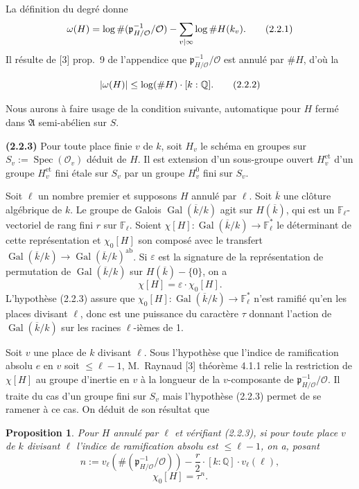 \documentclass[12pt,a4paper]{article}
\theoremstyle{plain}
\newtheorem{proposition}[theorem]{Proposition}
\theoremstyle{definition}
\theoremstyle{remark}
\DeclareMathOperator{\Spec}{Spec}
\DeclareMathOperator{\Gal}{Gal}
\newcommand{\QQ}{\mathbb{Q}}
\newcommand{\FF}{\mathbb{F}}
\newcommand{\cO}{\mathcal{O}}
\newcommand{\fA}{\mathfrak{A}}
\let\deg\relax
\providecommand{\FF}{\mathbb{F}}
\providecommand{\QQ}{\mathbb{Q}}
\providecommand{\cO}{\mathcal{O}}
\providecommand{\fA}{\mathfrak{A}}
\providecommand{\Gal}{\operatorname{Gal}}
\providecommand{\Spec}{\operatorname{Spec}}
\providecommand{\et}{\mathrm{et}}
\providecommand{\fp}{\mathfrak{p}}
\begin{document}
La définition du degré donne
\[
\deg \omega(H) = \log \#(\fp_{H/\cO}^{-1}/\cO) - \sum_{v|\infty} \log \#H(k_v). \tag{2.2.1}
\]
Il résulte de [3] prop.~9 de l'appendice que $\fp_{H/\cO}^{-1}/\cO$ est annulé par $\#H$, d'où la

\begin{equation}
|\deg \omega(H)| \leq \log(\#H) \cdot [k:\QQ]. \tag{2.2.2}
\end{equation}

Nous aurons à faire usage de la condition suivante, automatique pour $H$ fermé dans $\fA$ semi-abélien sur $S$.

\textbf{(2.2.3)} Pour toute place finie $v$ de $k$, soit $H_v$ le schéma en groupes sur $S_v := \Spec(\cO_v)$ déduit de $H$. Il est extension d'un sous-groupe ouvert $H_v^{\et}$ d'un groupe $H_v^{\et}$ fini étale sur $S_v$ par un groupe $H_v^0$ fini sur $S_v$.

Soit $\ell$ un nombre premier et supposons $H$ annulé par $\ell$. Soit $\overline{k}$ une clôture algébrique de $k$. Le groupe de Galois $\Gal(\overline{k}/k)$ agit sur $H(\overline{k})$, qui est un $\FF_\ell$-vectoriel de rang fini $r$ sur $\FF_\ell$. Soient $\chi[H] : \Gal(\overline{k}/k) \to \FF_\ell^*$ le déterminant de cette représentation et $\chi_0[H]$ son composé avec le transfert $\Gal(\overline{k}/k) \to \Gal(\overline{k}/k)^{\text{ab}}$. Si $\varepsilon$ est la signature de la représentation de permutation de $\Gal(\overline{k}/k)$ sur $H(\overline{k}) - \{0\}$, on a
\[
\chi[H] = \varepsilon \cdot \chi_0[H]. \tag{2.2.4}
\]
L'hypothèse (2.2.3) assure que $\chi_0[H] : \Gal(\overline{k}/k) \to \FF_\ell^*$ n'est ramifié qu'en les places divisant $\ell$, donc est une puissance du caractère $\tau$ donnant l'action de $\Gal(\overline{k}/k)$ sur les racines $\ell$-ièmes de 1.

Soit $v$ une place de $k$ divisant $\ell$. Sous l'hypothèse que l'indice de ramification absolu $e$ en $v$ soit $\leq \ell - 1$, M.~Raynaud [3] théorème 4.1.1 relie la restriction de $\chi[H]$ au groupe d'inertie en $v$ à la longueur de la $v$-composante de $\fp_{H/\cO}^{-1}/\cO$. Il traite du cas d'un groupe fini sur $S_v$ mais l'hypothèse (2.2.3) permet de se ramener à ce cas. On déduit de son résultat que

\begin{proposition}
Pour $H$ annulé par $\ell$ et vérifiant (2.2.3), si pour toute place $v$ de $k$ divisant $\ell$ l'indice de ramification absolu est $\leq \ell - 1$, on a, posant
\[
n := v_\ell(\#(\fp_{H/\cO}^{-1}/\cO)) - \frac{r}{2} \cdot [k:\QQ] \cdot v_\ell(\ell),
\]
\[
\chi_0[H] = \tau^n.
\]
\end{proposition}
\end{document}
